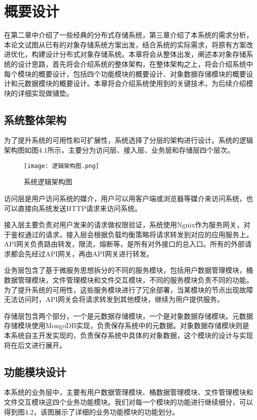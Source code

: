 
\chapter{概要设计}
在第二章中介绍了一些经典的分布式存储系统，第三章介绍了本系统的需求分析，本论文试图从已有的对象存储系统方案出发，结合系统的实际需求，将原有方案改进优化，构建设计分布式对象存储系统。本章将会从整体出发，阐述本对象存储系统的设计思路，首先将会介绍系统的整体架构，在整体架构之上，将会介绍系统中每个模块的概要设计，包括四个功能模块的概要设计、对象数据存储模块的概要设计和元数据模块的概要设计。本章将会介绍系统使用到的关键技术，为后续介绍模块的详细实现做铺垫。

\section{系统整体架构}%
为了提升系统的可用性和可扩展性，系统选择了分层的架构进行设计。系统的逻辑架构图如图4.1所示，主要分为访问层、接入层、业务层和存储层四个层次。

\begin{figure}[h]
  \centering
  \texttt{[image: 逻辑架构图.png]}
  \caption{系统逻辑架构图}
\end{figure}

访问层是用户访问系统的媒介，用户可以用客户端或浏览器等媒介来访问系统，也可以直接向系统发送HTTP请求来访问系统。

接入层主要负责对用户发来的请求做权限验证，系统使用Ngnix作为服务网关，对于鉴权通过的请求，接入层会根据负载均衡策略将请求转发到对应的应用服务上。API网关负责路由转发，限流，熔断等，是所有对外接口的总入口。所有的外部请求都会先经过API网关，再由API网关进行转发。

业务层包含了基于微服务思想拆分的不同的服务模块，包括用户数据管理模块，桶数据管理模块，文件管理模块和文件交互模块，不同的服务模块负责不同的功能。为了提升系统的可用性，这些服务模块进行了冗余部署，当某模块的节点出现故障无法访问时，API网关会将请求转发到其他模块，继续为用户提供服务。

存储层包含两个部分，一个是元数据存储模块，一个是对象数据存储模块。元数据存储模块使用MongoDB实现，负责保存系统中的元数据。对象数据存储模块则是本系统自主开发实现的，负责保存系统中具体的对象数据，这个模块的设计与实现将在后文进行展开。

\section{功能模块设计}
本系统的业务层中，主要有用户数据管理模块、桶数据管理模块、文件管理模块和文件交互模块这四个业务功能模块。我们对每一个模块的功能进行继续细分，可以得到图4.2，该图展示了详细的业务功能模块的功能划分。

